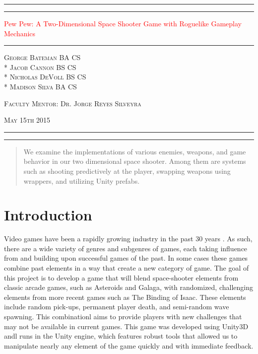 \documentclass[12pt]{article}       %
\def\hs{\hspace{15pt}}
\newcommand*{\titleAT}{\begingroup %
\newlength{\drop} %
\drop=0.1\textheight %

\rule{\textwidth}{1pt}\par %
\vspace{2pt}\vspace{-\baselineskip} %
\rule{\textwidth}{0.4pt}\par %

\vspace{\drop} %
\centering %
\textcolor{Red}{ %
{\Huge Pew Pew: A Two-Dimensional Space Shooter Game with Roguelike Gameplay Mechanics}\\[0.5\baselineskip] %
{\Huge }} %

\vspace{0.25\drop} %
\rule{0.3\textwidth}{0.4pt}\par %
\vspace{\drop} %

{\Large \textsc{George Bateman BA CS \\* Jacob Cannon BS CS \\* Nicholas DeVoll BS CS \\* \vspace{3pt} Madison Silva BA CS}}\par %

\vfill %

{\large \textsc{Faculty Mentor: Dr. Jorge Reyes Silveyra}}\par 

{\large \textsc{May 15th 2015}}\par

\vspace*{\drop} %

\rule{\textwidth}{0.4pt}\par %
\vspace{2pt}\vspace{-\baselineskip} %
\rule{\textwidth}{1pt}\par %

\endgroup}
\begin{document}
\begin{titlepage}
\thispagestyle{empty}
\titleAT
\end{titlepage}

\newpage
\begin{titlepage}
\thispagestyle{empty}
\tableofcontents
\end{titlepage}

\begin{titlepage}
\thispagestyle{empty}
\listoffigures
\end{titlepage}


\newpage

\begin{abstract} We examine the implementations of various enemies, weapons, and game behavior in our two dimensional space shooter. Among them are systems such as shooting predictively at the player, swapping weapons using wrappers, and utilizing Unity prefabs.
\end{abstract}

\section{Introduction} %
\label{sec:intro}

\hs Video games have been a rapidly growing industry in the past 30 years \cite{History}. As such, there are a wide variety of genres and subgenres of games, each taking influence from and building upon successful games of the past. In some cases these games combine past elements in a way that create a new category of game. The goal of this project is to develop a game that will blend space-shooter elements from classic arcade games, such as Asteroids and Galaga, with randomized, challenging elements from more recent games such as The Binding of Isaac. These elements include random pick-ups, permanent player death, and semi-random wave spawning. This combinationl aims to provide players with new challenges that may not be available in current games. This game was developed using Unity3D andl runs in the Unity engine, which features robust tools that allowed us to manipulate nearly any element of the game quickly and with immediate feedback.
\end{document}
